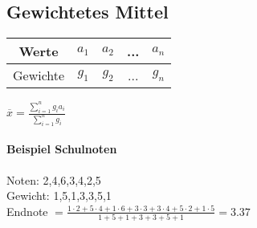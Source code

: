 \subsection{Gewichtetes Mittel}
\begin{tabular}{|c|c|c|c|c|}
\hline Werte & $ a_1 $ & $ a_2 $ & ... & $ a_n $ \\ 
\hline Gewichte & $ g_1 $ & $ g_2 $ & ... & $ g_n $ \\ 
\hline 
\end{tabular} 
$ \overline{x} = \frac{\sum_{i=1}^{n}g_i a_i}{\sum_{i=1}^{n} g_i} $

\paragraph{Beispiel Schulnoten}
Noten: 2,4,6,3,4,2,5\\
Gewicht: 1,5,1,3,3,5,1\\
Endnote $= \frac{1\cdot 2+ 5\cdot 4 + 1\cdot 6+ 3\cdot 3 + 3\cdot 4+ 5\cdot 2 + 1\cdot 5}{1+5+1+3+3+5+1} = 3.37 $

